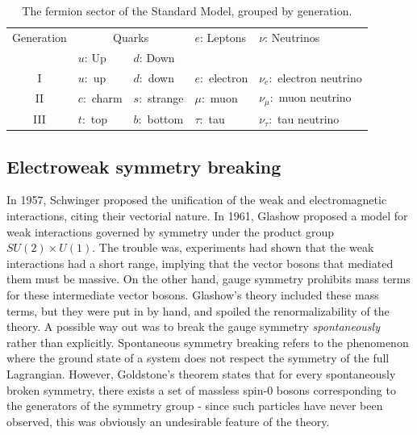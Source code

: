 \begin{table}
  \raggedright
\strictpagecheck
\begin{adjustwidth*}{0in}{0.5in}
  \begin{tabular}{cllll}
    \toprule
    Generation & \multicolumn{2}{c}{Quarks} & $e$: Leptons & $\nu$: Neutrinos \\ \cmidrule(r){2-3}
     & $u$: Up & $d$: Down &                                       & \\\midrule
    I           & $u:$ up                    & $d:$ down     & $e:$ electron                         & $\nu_e:$ electron neutrino\\
    II          & $c:$ charm                 & $s:$ strange  & $\mu:$ muon                           & $\nu_\mu:$ muon neutrino\\
    III         & $t:$ top                   & $b:$ bottom   & $\tau:$ tau                           & $\nu_\tau:$ tau neutrino\\
    \bottomrule
  \end{tabular}
  \caption{The fermion sector of the Standard Model, grouped by generation.}
  \label{tab:fermion_generations}
\end{adjustwidth*}
\end{table}
\subsection{Electroweak symmetry breaking}\label{subsec:ewsb}
In 1957, Schwinger proposed the unification of the weak and electromagnetic interactions, citing their vectorial nature. In 1961, Glashow proposed a model for weak interactions governed by symmetry under the product group $SU(2)\times U(1)$. The trouble was, experiments had shown that the weak interactions had a short range, implying that the vector bosons that mediated them must be massive. On the other hand, gauge symmetry prohibits mass terms for these intermediate vector bosons. Glashow's theory included these mass terms, but they were put in by hand, and spoiled the renormalizability of the theory. A possible way out was to break the gauge symmetry \emph{spontaneously} rather than explicitly. Spontaneous symmetry breaking refers to the phenomenon where the ground state of a system does not respect the symmetry of the full Lagrangian. However, Goldstone's theorem states that for every spontaneously broken symmetry, there exists a set of massless spin-0 bosons corresponding to the generators of the symmetry group - since such particles have never been observed, this was obviously an undesirable feature of the theory. 

